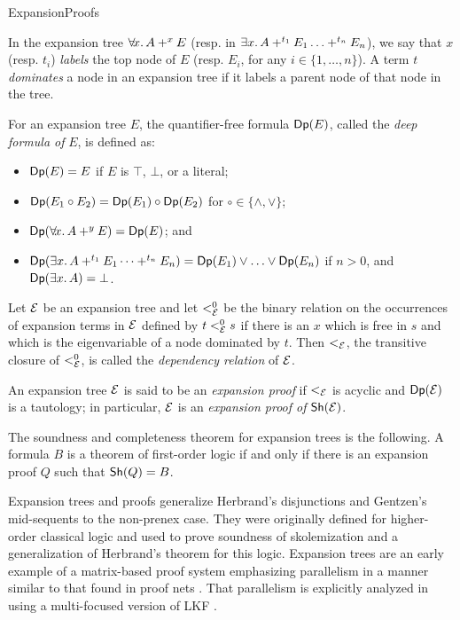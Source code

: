 \begin{entry}{ExpansionProofs}
\begin{calculus}
\medskip

In the expansion tree $\ALLx x. A +^x E$ (resp. in $\EX x. A +^{t_1} E_1
\ldots +^{t_n} E_n$), we say that $x$ (resp. $t_i$) \emph{labels} the top node
of $E$ (resp. $E_i$, for any $i \in\{1,\ldots,n\}$).  A term
$t$ \emph{dominates} a node in an expansion tree if it labels a parent
node of that node in the tree.

\medskip

For an expansion tree $E$, the quantifier-free formula $\mathsf{Dp}(E)$, 
called the \emph{deep formula of} $E$, is defined as:
\begin{itemize}
\item $\mathsf{Dp}(E) = E$ if $E$ is $\top$, $\bot$, or a literal;
\item $\mathsf{Dp}(E_1 \circ E_2) = \mathsf{Dp}(E_1) \circ \mathsf{Dp}(E_2)$ for
      $\circ\in\{\land, \lor \}$; 
\item $\Deep{\ALLx x. A +^y E} = \Deep{E}$; and
\item $\Deep{\EX x. A +^{t_1} E_1 \cdots +^{t_n} E_n} = 
       \Deep{E_1}\lor\ldots\lor \Deep{E_n}$ if $n > 0$, and $\Deep{\EX
  x. A} = \bot$. 
\end{itemize}

Let $\mathcal{E}$ be an expansion tree and let $<^0_{\mathcal{E}}$ be the binary
relation on the occurrences of expansion terms in $\mathcal{E}$ defined by
$t <^0_{\mathcal{E}} s$ if there is an $x$ which is free in $s$ and which is
the eigenvariable of a node dominated by $t$.  Then $<_{\mathcal{E}}$, the
transitive closure of $<^0_{\mathcal{E}}$, is called the
\emph{dependency relation} of $\mathcal{E}$.

\medskip

An expansion tree $\mathcal{E}$ is said to be an \emph{expansion proof} if
$<_{\mathcal{E}}$ is acyclic and $\mathsf{Dp}(\mathcal{E})$ is a tautology; in particular,
$\mathcal{E}$ is an \emph{expansion proof of} $\mathsf{Sh}(\mathcal{E})$.
\end{calculus}


\begin{clarifications}
The soundness and completeness theorem for expansion trees is the
following.  A formula $B$ is a theorem of first-order logic if and
only if there is an expansion proof $Q$ such that $\mathsf{Sh}(Q)=B$.
\end{clarifications}

\begin{history}
Expansion trees and proofs \cite{miller87sl,miller83}
generalize Herbrand's disjunctions and
Gentzen's mid-sequents to the non-prenex case.  
They were originally defined
for higher-order classical logic and used to prove soundness
of skolemization and a generalization of
Herbrand's theorem for this logic.  Expansion trees are an early example of a
matrix-based proof system emphasizing parallelism in a manner similar to that found in proof
nets .  That parallelism is explicitly analyzed
in \cite{chaudhuri14jlc} using a multi-focused version of
LKF .
\end{history}



\end{entry}
